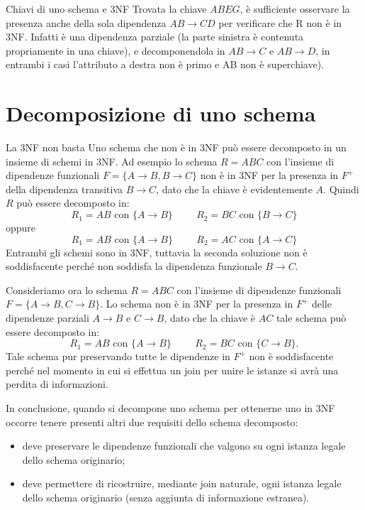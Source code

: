 \begin{Example}{Chiavi di uno schema e 3NF}{}
    Trovata la chiave $ABEG$, è sufficiente osservare la presenza anche della sola dipendenza $AB\to CD$ per verificare che R non è in 3NF. Infatti è una dipendenza parziale (la parte sinistra è contenuta propriamente in una chiave), e decomponendola in $AB\to C$ e $AB\to D$, in entrambi i casi l'attributo a destra non è primo e AB non è superchiave).
\end{Example}

\section{Decomposizione di uno schema}
\begin{Osservation}{La 3NF non basta}{}\label{oss:3NF-non-basta}
    Uno schema che non è in 3NF può essere decomposto in un insieme di schemi in 3NF. Ad esempio lo schema $R=ABC$ con l'insieme di dipendenze funzionali $F=\{A\to B, B\to C\}$ non è in 3NF per la presenza in $F^+$ della dipendenza transitiva $B\to C$, dato che la chiave è evidentemente $A$. Quindi $R$ può essere decomposto in:
    \begin{equation*}
        R_1=AB\mbox{ con }\{A\to B\}\hspace{1cm}R_2=BC\mbox{ con }\{B\to C\}
    \end{equation*}
    oppure
    \begin{equation*}
        R_1=AB\mbox{ con }\{A\to B\}\hspace{1cm}R_2=AC\mbox{ con }\{A\to C\}
    \end{equation*}
    Entrambi gli schemi sono in 3NF, tuttavia la seconda soluzione non è soddisfacente perché non soddisfa la dipendenza funzionale $B\to C$.

    Consideriamo ora lo schema $R=ABC$ con l'insieme di dipendenze funzionali $F=\{A\to B, C\to B\}$. Lo schema non è in 3NF per la presenza in $F^+$ delle dipendenze parziali $A\to B$ e $C\to B$, dato che la chiave è $AC$ tale schema può essere decomposto in:
    \begin{equation*}
        R_1=AB\mbox{ con }\{A\to B\}\hspace{1cm}R_2=BC\mbox{ con }\{C\to B\}.
    \end{equation*}
    Tale schema pur preservando tutte le dipendenze in $F^+$ non è soddisfacente perché nel momento in cui si effettua un join per unire le istanze si avrà una perdita di informazioni.
\end{Osservation}

In conclusione, quando si decompone uno schema per ottenerne uno in 3NF occorre tenere presenti altri due requisiti dello schema decomposto: 
\begin{itemize}
    \item deve preservare le dipendenze funzionali che valgono su ogni istanza legale dello schema originario;
    \item deve permettere di ricostruire, mediante join naturale, ogni istanza legale dello schema originario (senza aggiunta di informazione estranea).
\end{itemize}

